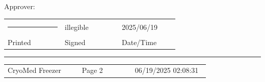 \documentclass[UTF8,10pt,a4paper,fontset=fandol]{ctexart}
\newcommand{\fieldvalue}[1]{#1}
\newcommand{\handwritten}[1]{#1}
\begin{document}
\vspace{0.35cm}

\noindent Approver:

\vspace{0.05cm}
\noindent
\begin{tabular}{p{0.25\linewidth} p{0.25\linewidth} p{0.25\linewidth}}
\rule{\linewidth}{0.4pt} &
\fieldvalue{\handwritten{illegible}} &
\fieldvalue{\handwritten{2025/06/19}}\\
Printed & Signed & Date/Time
\end{tabular}

\vfill

\noindent\rule{\linewidth}{0.4pt}

\noindent
\begin{tabular}{p{0.35\linewidth} p{0.25\linewidth} p{0.35\linewidth}}
CryoMed Freezer & Page 2 & 06/19/2025 02:08:31
\end{tabular}

\newpage
\end{document}
